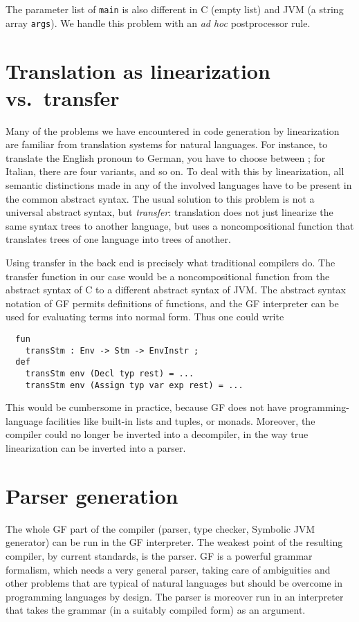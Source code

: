 \documentclass[12pt]{article}
\newcommand{\empha}[1]{{\em #1}}
\begin{document}
The parameter list of \texttt{main} is also different in C (empty list)
and JVM (a string array \texttt{args}). We handle this problem
with an \empha{ad hoc} postprocessor rule.


\section{Translation as linearization vs.\ transfer}

Many of the problems we have encountered in code generation by
linearization are familiar from
translation systems for natural languages. For instance, to translate
the English pronoun  to German, you have to choose
between ; for Italian, there are four
variants, and so on. To deal with this by linearization,
all semantic distinctions made in any of the involved languages 
have to be present in the common abstract syntax. The usual solution to 
this problem is not a universal abstract syntax, but
\empha{transfer}: translation does not just linearize
the same syntax trees to another language, but uses
a noncompositional function that translates
trees of one language into trees of another.

Using transfer in the
back end is precisely what traditional compilers do.
The transfer function in our case would be a noncompositional
function from the abstract syntax of C to a different abstract
syntax of JVM. The abstract syntax notation of GF permits
definitions of functions, and the GF interpreter can be used
for evaluating terms into normal form. Thus one could write
\begin{verbatim}
  fun 
    transStm : Env -> Stm -> EnvInstr ;
  def
    transStm env (Decl typ rest) = ... 
    transStm env (Assign typ var exp rest) = ... 
\end{verbatim}
This would be cumbersome in practice, because
GF does not have programming-language facilities 
like built-in lists and tuples, or monads. Moreover,
the compiler could no longer be inverted into a decompiler, 
in the way true linearization can be inverted into a parser.



\section{Parser generation}
\label{bnfc}

The whole GF part of the compiler (parser, type checker, Symbolic JVM
generator) can be run in the GF interpreter. 
The weakest point of the resulting compiler, by current
standards, is the parser. GF is a powerful grammar formalism, which
needs a very general parser, taking care of ambiguities and other
problems that are typical of natural languages but should be
overcome in programming languages by design. The parser is moreover run
in an interpreter that takes the grammar (in a suitably compiled form)
as an argument. 
\end{document}
